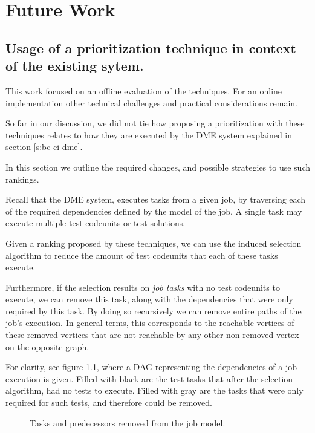 \chapter{Future Work}

\section{Usage of a prioritization technique in context of the existing sytem.}

This work focused on an offline evaluation of the techniques. For an online implementation
other technical challenges and practical considerations remain.

So far in our discussion, we did not tie how proposing a prioritization
with these techniques relates to how they are executed by the DME system explained
in section \ref{s:bc-ci-dme}.

In this section we outline the required changes, and possible strategies to use
such rankings.

Recall that the DME system, executes tasks from a given job, by
traversing each of the required dependencies defined by the model of the job. 
A single task may execute multiple test codeunits or test solutions. 

Given a ranking proposed by these techniques, we can use the induced selection
algorithm to reduce the amount of test codeunits that each of these tasks execute.

Furthermore, if the selection results on \emph{job tasks} with no test codeunits to
execute, we can remove this task, along with the dependencies that were 
only required by this task. By doing so recursively we can remove entire paths of the
job's execution. In general terms, this corresponds to the reachable vertices
of these removed vertices that are not reachable by any other non removed vertex 
on the opposite graph.

For clarity, see figure \ref{f:conc-fut-dag-removingtask}, where a DAG representing the dependencies of a job 
execution is given. Filled with black are the test tasks that after the selection
algorithm, had no tests to execute. Filled with gray are the tasks that were only
required for such tests, and therefore could be removed.

\begin{figure}
    \centering
    \def\svgwidth{0.5\columnwidth}
    
    \caption{Tasks and predecessors removed from the job model.}
    \label{f:conc-fut-dag-removingtask}
\end{figure}

